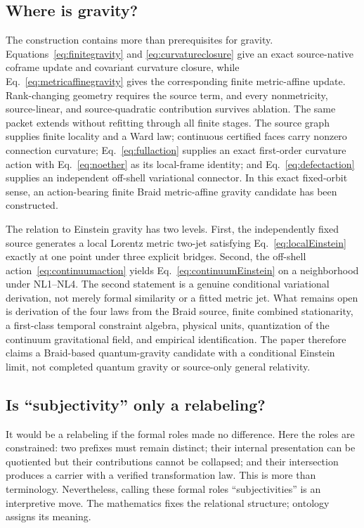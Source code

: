 \documentclass[11pt]{article}
\theoremstyle{definition}
\theoremstyle{remark}
\begin{document}
\subsection{Where is gravity?}

The construction contains more than prerequisites for gravity. Equations~\eqref{eq:finitegravity} and \eqref{eq:curvatureclosure} give an exact source-native coframe update and covariant curvature closure, while Eq.~\eqref{eq:metricaffinegravity} gives the corresponding finite metric-affine update. Rank-changing geometry requires the source term, and every nonmetricity, source-linear, and source-quadratic contribution survives ablation. The same packet extends without refitting through all finite stages. The source graph supplies finite locality and a Ward law; continuous certified faces carry nonzero connection curvature; Eq.~\eqref{eq:fullaction} supplies an exact first-order curvature action with Eq.~\eqref{eq:noether} as its local-frame identity; and Eq.~\eqref{eq:defectaction} supplies an independent off-shell variational connector. In this exact fixed-orbit sense, an action-bearing finite Braid metric-affine gravity candidate has been constructed.

The relation to Einstein gravity has two levels. First, the independently fixed source generates a local Lorentz metric two-jet satisfying Eq.~\eqref{eq:localEinstein} exactly at one point under three explicit bridges. Second, the off-shell action~\eqref{eq:continuumaction} yields Eq.~\eqref{eq:continuumEinstein} on a neighborhood under NL1--NL4. The second statement is a genuine conditional variational derivation, not merely formal similarity or a fitted metric jet. What remains open is derivation of the four laws from the Braid source, finite combined stationarity, a first-class temporal constraint algebra, physical units, quantization of the continuum gravitational field, and empirical identification. The paper therefore claims a Braid-based quantum-gravity candidate with a conditional Einstein limit, not completed quantum gravity or source-only general relativity.

\subsection{Is ``subjectivity'' only a relabeling?}

It would be a relabeling if the formal roles made no difference. Here the roles are constrained: two prefixes must remain distinct; their internal presentation can be quotiented but their contributions cannot be collapsed; and their intersection produces a carrier with a verified transformation law. This is more than terminology. Nevertheless, calling these formal roles ``subjectivities'' is an interpretive move. The mathematics fixes the relational structure; ontology assigns its meaning.
\end{document}

